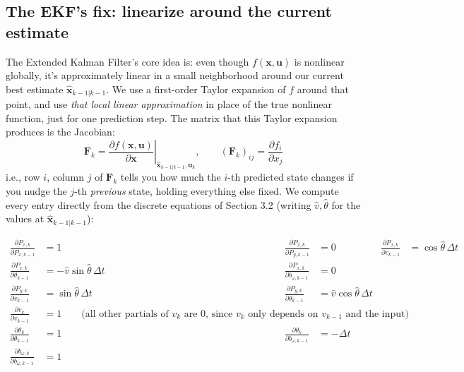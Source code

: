 \documentclass[11pt,a4paper]{article}
\begin{document}
\subsection{The EKF's fix: linearize around the current estimate}
The Extended Kalman Filter's core idea is: even though $f(\mathbf{x},\mathbf{u})$ is nonlinear globally, it's approximately linear in a small neighborhood around our current best estimate $\hat{\mathbf{x}}_{k-1|k-1}$. We use a first-order Taylor expansion of $f$ around that point, and use \emph{that local linear approximation} in place of the true nonlinear function, just for one prediction step. The matrix that this Taylor expansion produces is the Jacobian:
\begin{equation}
    \mathbf{F}_k = \left.\frac{\partial f(\mathbf{x},\mathbf{u})}{\partial \mathbf{x}}\right|_{\hat{\mathbf{x}}_{k-1|k-1}, \mathbf{u}_k}, \qquad
    (\mathbf{F}_k)_{ij} = \frac{\partial f_i}{\partial x_j}
\end{equation}
i.e., row $i$, column $j$ of $\mathbf{F}_k$ tells you how much the $i$-th predicted state changes if you nudge the $j$-th \emph{previous} state, holding everything else fixed. We compute every entry directly from the discrete equations of Section 3.2 (writing $\hat v, \hat\theta$ for the values at $\hat{\mathbf{x}}_{k-1|k-1}$):

\begin{align*}
\frac{\partial P_{x,k}}{\partial P_{x,k-1}} &= 1 &
\frac{\partial P_{x,k}}{\partial P_{y,k-1}} &= 0 &
\frac{\partial P_{x,k}}{\partial v_{k-1}} &= \cos\hat\theta\,\Delta t \\
\frac{\partial P_{x,k}}{\partial \theta_{k-1}} &= -\hat v \sin\hat\theta\,\Delta t &
\frac{\partial P_{x,k}}{\partial b_{\omega,k-1}} &= 0 \\[4pt]
\frac{\partial P_{y,k}}{\partial v_{k-1}} &= \sin\hat\theta\,\Delta t &
\frac{\partial P_{y,k}}{\partial \theta_{k-1}} &= \hat v\cos\hat\theta\,\Delta t \\[4pt]
\frac{\partial v_k}{\partial v_{k-1}} &= 1 \qquad \text{(all other partials of } v_k \text{ are } 0\text{, since } v_k \text{ only depends on } v_{k-1} \text{ and the input)} \\[4pt]
\frac{\partial \theta_k}{\partial \theta_{k-1}} &= 1 &
\frac{\partial \theta_k}{\partial b_{\omega,k-1}} &= -\Delta t \\[4pt]
\frac{\partial b_{\omega,k}}{\partial b_{\omega,k-1}} &= 1
\end{align*}
\end{document}

